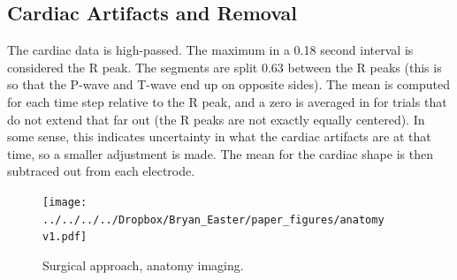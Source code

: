 \documentclass[]{article}
\begin{document}
\subsection{Cardiac Artifacts and Removal}
The cardiac data is high-passed.
The maximum in a 0.18 second interval is considered the R peak.
The segments are split 0.63 between the R peaks (this is so that the P-wave and T-wave end up on opposite sides).
The mean is computed for each time step relative to the R peak, and a zero is averaged in for trials that do not extend that far out (the R peaks are not exactly equally centered).
In some sense, this indicates uncertainty in what the cardiac artifacts are at that time, so a smaller adjustment is made.
The mean for the cardiac shape is then subtraced out from each electrode.
\label{section:cardiac}
\begin{figure}[H]
\begin{center}
\texttt{[image: ../../../../Dropbox/Bryan\_Easter/paper\_figures/anatomy v1.pdf]}
\caption{Surgical approach, anatomy imaging.}
\label{fig:surgical}
\end{center}
\end{figure}
\end{document}
